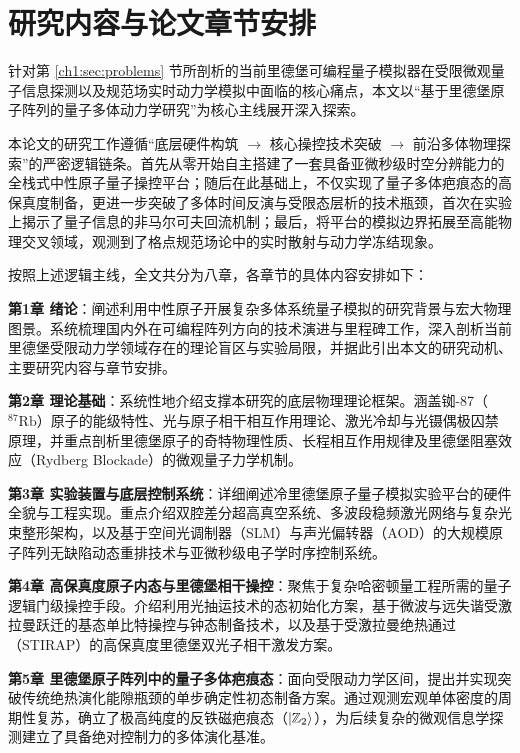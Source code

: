 \documentclass[../main.tex]{subfiles}
\begin{document}
\section{研究内容与论文章节安排}
\label{ch1:sec:content}

针对第 \ref{ch1:sec:problems} 节所剖析的当前里德堡可编程量子模拟器在受限微观量子信息探测以及规范场实时动力学模拟中面临的核心痛点，本文以“基于里德堡原子阵列的量子多体动力学研究”为核心主线展开深入探索。

本论文的研究工作遵循“底层硬件构筑 $\rightarrow$ 核心操控技术突破 $\rightarrow$ 前沿多体物理探索”的严密逻辑链条。首先从零开始自主搭建了一套具备亚微秒级时空分辨能力的全栈式中性原子量子操控平台；随后在此基础上，不仅实现了量子多体疤痕态的高保真度制备，更进一步突破了多体时间反演与受限态层析的技术瓶颈，首次在实验上揭示了量子信息的非马尔可夫回流机制；最后，将平台的模拟边界拓展至高能物理交叉领域，观测到了格点规范场论中的实时散射与动力学冻结现象。

按照上述逻辑主线，全文共分为八章，各章节的具体内容安排如下：

\textbf{第1章 绪论}：阐述利用中性原子开展复杂多体系统量子模拟的研究背景与宏大物理图景。系统梳理国内外在可编程阵列方向的技术演进与里程碑工作，深入剖析当前里德堡受限动力学领域存在的理论盲区与实验局限，并据此引出本文的研究动机、主要研究内容与章节安排。

\textbf{第2章 理论基础}：系统性地介绍支撑本研究的底层物理理论框架。涵盖铷-87（$^{87}\text{Rb}$）原子的能级特性、光与原子相干相互作用理论、激光冷却与光镊偶极囚禁原理，并重点剖析里德堡原子的奇特物理性质、长程相互作用规律及里德堡阻塞效应（Rydberg Blockade）的微观量子力学机制。

\textbf{第3章 实验装置与底层控制系统}：详细阐述冷里德堡原子量子模拟实验平台的硬件全貌与工程实现。重点介绍双腔差分超高真空系统、多波段稳频激光网络与复杂光束整形架构，以及基于空间光调制器（SLM）与声光偏转器（AOD）的大规模原子阵列无缺陷动态重排技术与亚微秒级电子学时序控制系统。

\textbf{第4章 高保真度原子内态与里德堡相干操控}：聚焦于复杂哈密顿量工程所需的量子逻辑门级操控手段。介绍利用光抽运技术的态初始化方案，基于微波与远失谐受激拉曼跃迁的基态单比特操控与钟态制备技术，以及基于受激拉曼绝热通过（STIRAP）的高保真度里德堡双光子相干激发方案。

\textbf{第5章 里德堡原子阵列中的量子多体疤痕态}：面向受限动力学区间，提出并实现突破传统绝热演化能隙瓶颈的单步确定性初态制备方案。通过观测宏观单体密度的周期性复苏，确立了极高纯度的反铁磁疤痕态（$\ket{\mathbb{Z}_2}$），为后续复杂的微观信息学探测建立了具备绝对控制力的多体演化基准。
\end{document}
